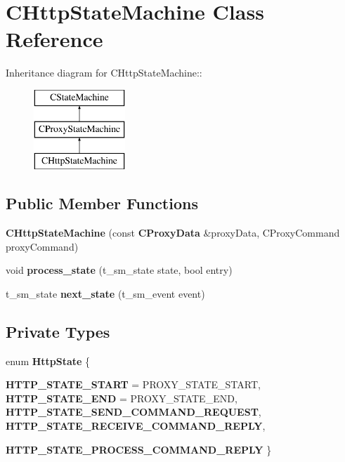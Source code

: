 \section{CHttpStateMachine Class Reference}
\label{classCHttpStateMachine}
Inheritance diagram for CHttpStateMachine::\begin{figure}[H]
\begin{center}
\leavevmode
\includegraphics[height=3cm]{classCHttpStateMachine}
\end{center}
\end{figure}
\subsection*{Public Member Functions}
\begin{DoxyCompactItemize}
\item 
{\bfseries CHttpStateMachine} (const {\bf CProxyData} \&proxyData, CProxyCommand proxyCommand)\label{classCHttpStateMachine_abbd5daffe01d700f0106cfc6fd222436}

\item 
void {\bfseries process\_\-state} (t\_\-sm\_\-state state, bool entry)\label{classCHttpStateMachine_aa64e0cb0a61bf4282c3a610f72f2f5c1}

\item 
t\_\-sm\_\-state {\bfseries next\_\-state} (t\_\-sm\_\-event event)\label{classCHttpStateMachine_a8ffe9311beede60ef6d666d7ca31823d}

\end{DoxyCompactItemize}
\subsection*{Private Types}
\begin{DoxyCompactItemize}
\item 
enum {\bfseries HttpState} \{ \par
{\bfseries HTTP\_\-STATE\_\-START} =  PROXY\_\-STATE\_\-START, 
{\bfseries HTTP\_\-STATE\_\-END} =  PROXY\_\-STATE\_\-END, 
{\bfseries HTTP\_\-STATE\_\-SEND\_\-COMMAND\_\-REQUEST}, 
{\bfseries HTTP\_\-STATE\_\-RECEIVE\_\-COMMAND\_\-REPLY}, 
\par
{\bfseries HTTP\_\-STATE\_\-PROCESS\_\-COMMAND\_\-REPLY}
 \}
\end{DoxyCompactItemize}
